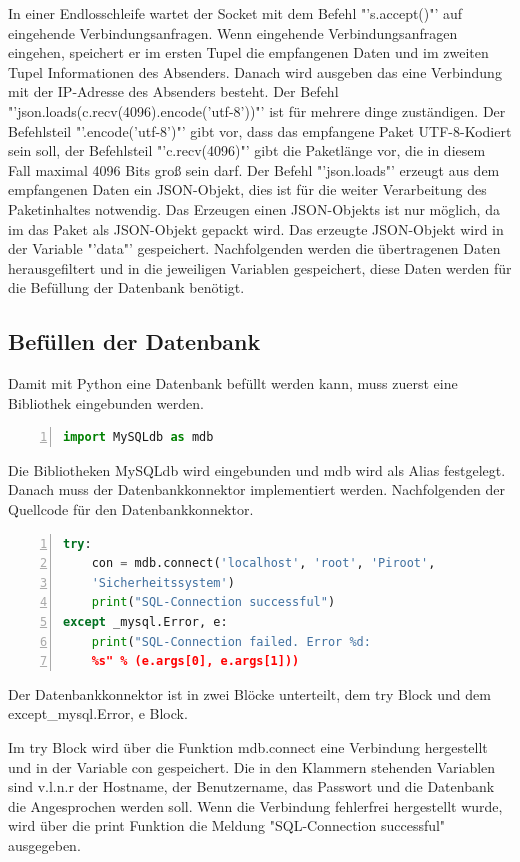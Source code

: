 In einer Endlosschleife wartet der Socket mit dem Befehl "'s.accept()"' auf eingehende Verbindungsanfragen. Wenn eingehende Verbindungsanfragen eingehen, speichert er im ersten Tupel die empfangenen Daten und im zweiten Tupel Informationen des Absenders. Danach wird ausgeben das eine Verbindung mit der IP-Adresse des Absenders besteht. Der Befehl "'json.loads(c.recv(4096).encode('utf-8'))"' ist für mehrere dinge zuständigen. Der Befehlsteil "'.encode('utf-8')"' gibt vor, dass das empfangene Paket UTF-8-Kodiert sein soll, der Befehlsteil "'c.recv(4096)"' gibt die Paketlänge vor, die in diesem Fall maximal 4096 Bits groß sein darf. Der Befehl "'json.loads"' erzeugt aus dem empfangenen Daten ein JSON-Objekt, dies ist für die weiter Verarbeitung des Paketinhaltes notwendig. Das Erzeugen einen JSON-Objekts ist nur möglich, da im  das Paket als JSON-Objekt gepackt wird. Das erzeugte JSON-Objekt wird in der Variable "'data"' gespeichert. Nachfolgenden werden die übertragenen Daten herausgefiltert und in die jeweiligen Variablen gespeichert, diese Daten werden für die Befüllung der Datenbank benötigt.

\subsection{Befüllen der Datenbank}
Damit mit Python eine Datenbank befüllt werden kann, muss zuerst eine Bibliothek eingebunden werden.
\begin{lstlisting}[caption=Einbinden der Bibliothek für die Datenbank,frame=single,numbers=left,language=Python]
import MySQLdb as mdb
\end{lstlisting}
Die Bibliotheken MySQLdb wird eingebunden und mdb wird als Alias festgelegt.\hfill
\noindent Danach muss der Datenbankkonnektor implementiert werden. Nachfolgenden der Quellcode für den Datenbankkonnektor.
\begin{lstlisting}[caption=Datenbankkonnekor,frame=single,numbers=left,language=Python]
try:
	con = mdb.connect('localhost', 'root', 'Piroot',
	'Sicherheitssystem')
	print("SQL-Connection successful")
except _mysql.Error, e:
	print("SQL-Connection failed. Error %d:
	%s" % (e.args[0], e.args[1]))
\end{lstlisting}
Der Datenbankkonnektor ist in zwei Blöcke unterteilt, dem try Block und dem except\_mysql.Error, e Block.

\noindent Im try Block wird über die Funktion mdb.connect eine Verbindung hergestellt und in der Variable con \label{con} gespeichert. Die in den Klammern stehenden Variablen sind v.l.n.r der Hostname, der Benutzername, das Passwort und die Datenbank die Angesprochen werden soll. Wenn die Verbindung fehlerfrei hergestellt wurde, wird über die print Funktion die Meldung "SQL-Connection successful" ausgegeben.

